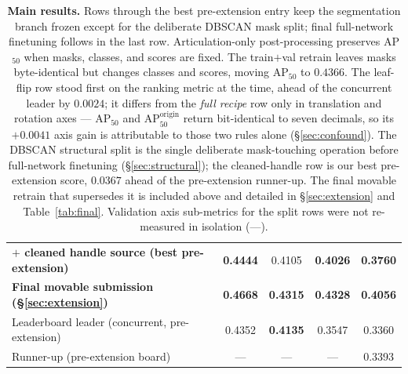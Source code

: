 \documentclass[11pt]{article}
\newcommand{\apfifty}{AP$_{50}$}
\begin{document}
\begin{table}[t]
\begin{tabular}{lcccc}
\textbf{$+$ cleaned handle source (best pre-extension)} & \textbf{0.4444} & 0.4105 & \textbf{0.4026} & \textbf{0.3760} \\
\textbf{Final movable submission (\S\ref{sec:extension})} & \textbf{0.4668} & \textbf{0.4315} & \textbf{0.4328} & \textbf{0.4056} \\
\midrule
Leaderboard leader (concurrent, pre-extension) & 0.4352 & \textbf{0.4135} & 0.3547 & 0.3360 \\
Runner-up (pre-extension board)       & --- & --- & --- & 0.3393 \\
\bottomrule
\end{tabular}
\caption{\textbf{Main results.} Rows through the best pre-extension entry
keep the segmentation branch frozen except for the deliberate DBSCAN mask
split; final full-network finetuning follows in the last row. Articulation-only
post-processing preserves \apfifty{} when masks, classes, and scores are
fixed. The train$+$val retrain leaves masks byte-identical but changes classes
and scores, moving \apfifty{} to $0.4366$. The leaf-flip row stood first on the ranking metric
at the time, ahead of the concurrent leader by $0.0024$; it differs from the
\emph{full recipe} row only in translation and rotation axes --- \apfifty{}
and AP$_{50}^{\text{origin}}$ return bit-identical to seven decimals, so its
$+0.0041$ axis gain is attributable to those two rules alone
(\S\ref{sec:confound}). The DBSCAN structural split is the single deliberate
mask-touching operation before full-network finetuning (\S\ref{sec:structural}); the
cleaned-handle row is our best pre-extension score, $0.0367$ ahead of the
pre-extension runner-up. The final movable retrain that supersedes it is
included above and detailed in \S\ref{sec:extension} and Table~\ref{tab:final}. Validation
axis sub-metrics for the split rows were not re-measured in isolation
(---).}
\label{tab:main}
\end{table}
\end{document}

